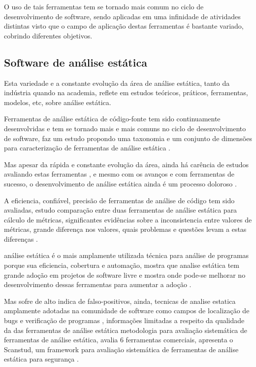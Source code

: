 O uso de tais ferramentas tem se
tornado mais comum no ciclo de desenvolvimento de
software, sendo aplicadas em uma infinidade de atividades distintas visto que o
campo de aplicação destas ferramentas é bastante variado, cobrindo diferentes
objetivos.

\subsection{Software de análise estática}

Esta variedade e a constante evolução da área de análise estática, tanto da
indústria quando na academia, reflete em estudos teóricos, práticos,
ferramentas, modelos, etc, sobre análise estática.

Ferramentas de análise estática de código-fonte tem sido continuamente
desenvolvidas e tem se tornado mais e mais comuns no ciclo de desenvolvimento
de software, faz um estudo propondo uma taxonomia e um conjunto de dimensões
para caracterização de ferramentas de análise estática \cite{Novak2010}.

Mas apesar da rápida e constante evolução da área, ainda há carência de estudos
avaliando estas ferramentas \cite{Li2010}, e mesmo com os avanços e com
ferramentas de sucesso, o desenvolvimento de análise estática ainda é um
processo doloroso \cite{toman2017taming}.

A eficiencia, confiável, precisão de ferramentas de análise de código tem sido
avaliadas, estudo comparação entre duas ferramentas de análise estática para
cálculo de métricas, significantes evidências sobre a inconsistencia entre
valores de métricas, grande diferença nos valores, quais problemas e questões
levam a estas diferenças \cite{Alemerien2013}.


análise estática é o mais amplamente utilizada técnica para análise de
programas porque sua eficiencia, cobertura e automação, 
mostra que analise estática tem grande adoção em projetos de software livre e
mostra onde pode-se melhorar no desenvolvimento dessas ferramentas para
aumentar a adoção \cite{beller2016analyzing}.

Mas sofre de alto indica de falso-positivos, ainda, tecnicas de analise
estatica amplamente adotadas na comunidade de software como campos de
localização de bugs e verificação de programas \cite{Gosain2015}, informações
limitadas a respeito da qualidade da das ferramentas de análise estática
metodologia para avaliação sistemática de ferramentas de análise estática,
avalia 6 ferramentas comerciais, apresenta o Scanstud, um framework para
avaliação sistemática de ferramentas de análise estática para segurança
\cite{Johns2011}.

